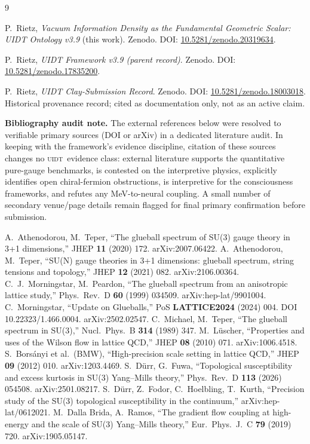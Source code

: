 \documentclass[12pt,a4paper,twoside]{article}
\theoremstyle{plain}
\theoremstyle{definition}
\theoremstyle{remark}
\newcommand{\UIDT}{\textsc{uidt}} %
\begin{document}
\newpage

\begin{thebibliography}{9}
\footnotesize

P.~Rietz, \textit{Vacuum Information Density as the Fundamental Geometric Scalar: UIDT Ontology v3.9} (this work). Zenodo. DOI: \href{https://doi.org/10.5281/zenodo.20319634}{10.5281/zenodo.20319634}.

P.~Rietz, \textit{UIDT Framework v3.9 (parent record)}. Zenodo. DOI: \href{https://doi.org/10.5281/zenodo.17835200}{10.5281/zenodo.17835200}.

P.~Rietz, \textit{UIDT Clay-Submission Record}. Zenodo. DOI: \href{https://doi.org/10.5281/zenodo.18003018}{10.5281/zenodo.18003018}. Historical provenance record; cited as documentation only, not as an active claim.

\textbf{Bibliography audit note.} The external references below were resolved to verifiable primary sources (DOI or arXiv) in a dedicated literature audit. In keeping with the framework's evidence discipline, citation of these sources changes no \UIDT\ evidence class: external literature supports the quantitative pure-gauge benchmarks, is contested on the interpretive physics, explicitly identifies open chiral-fermion obstructions, is interpretive for the consciousness frameworks, and refutes any MeV-to-neural coupling. A small number of secondary venue/page details remain flagged for final primary confirmation before submission.

A.~Athenodorou, M.~Teper, ``The glueball spectrum of SU(3) gauge theory in 3+1 dimensions,'' JHEP \textbf{11} (2020) 172. arXiv:2007.06422.
A.~Athenodorou, M.~Teper, ``SU(N) gauge theories in 3+1 dimensions: glueball spectrum, string tensions and topology,'' JHEP \textbf{12} (2021) 082. arXiv:2106.00364.
C.~J.~Morningstar, M.~Peardon, ``The glueball spectrum from an anisotropic lattice study,'' Phys.\ Rev.\ D \textbf{60} (1999) 034509. arXiv:hep-lat/9901004.
C.~Morningstar, ``Update on Glueballs,'' PoS \textbf{LATTICE2024} (2024) 004. DOI 10.22323/1.466.0004. arXiv:2502.02547.
C.~Michael, M.~Teper, ``The glueball spectrum in SU(3),'' Nucl.\ Phys.\ B \textbf{314} (1989) 347.
M.~L\"uscher, ``Properties and uses of the Wilson flow in lattice QCD,'' JHEP \textbf{08} (2010) 071. arXiv:1006.4518.
S.~Bors\'anyi et al.\ (BMW), ``High-precision scale setting in lattice QCD,'' JHEP \textbf{09} (2012) 010. arXiv:1203.4469.
S.~D\"urr, G.~Fuwa, ``Topological susceptibility and excess kurtosis in SU(3) Yang--Mills theory,'' Phys.\ Rev.\ D \textbf{113} (2026) 054508. arXiv:2501.08217.
S.~D\"urr, Z.~Fodor, C.~Hoelbling, T.~Kurth, ``Precision study of the SU(3) topological susceptibility in the continuum,'' arXiv:hep-lat/0612021.
M.~Dalla Brida, A.~Ramos, ``The gradient flow coupling at high-energy and the scale of SU(3) Yang--Mills theory,'' Eur.\ Phys.\ J.\ C \textbf{79} (2019) 720. arXiv:1905.05147.


\end{thebibliography}
\end{document}
